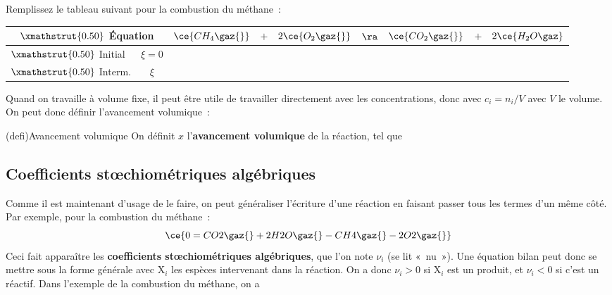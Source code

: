 \documentclass[../../main/main.tex]{subfiles}
\begin{document}
Remplissez le tableau suivant pour la combustion du méthane~:
\begin{center}
	\def\rhgt{0.50}
	\centering
	\begin{tabularx}{\linewidth}{|l|c|YdYdYdY|}
		\hline
		\multicolumn{2}{|c|}{
			$\xmathstrut{\rhgt}$
		\textbf{Équation}}                 &
		$\ce{CH_4\gaz{}}$                  & $+$       &
		$2\ce{O_2\gaz{}}$                  & $\ra$     &
		$\ce{CO_2\gaz{}}$                  & $+$       &
		$2\ce{H_2O\gaz}$                                 \\
		\hline
		$\xmathstrut{\rhgt}$
		Initial                            & $\xi = 0$ &
		       & \vline    &
		        & \vline    &
		       & \vline    &
		                       \\
		\hline
		$\xmathstrut{\rhgt}$
		Interm.                            & $\xi$     &
		 & \vline    &
		 & \vline    &
		 & \vline    &
		                \\
		\hline
	\end{tabularx}
\end{center}

Quand on travaille à volume fixe, il peut être utile de travailler directement
avec les concentrations, donc avec $c_i = n_i/V$ avec $V$ le volume. On peut
donc définir l'avancement volumique~:

\begin{tcb}[label=def:x, sidebyside, righthand ratio=.4](defi){Avancement volumique}
	On définit $x$ l'\textbf{avancement volumique} de la réaction, tel que
	\psw{
		\[
			\boxed{x = \frac{\xi}{V}}
		\]
	}
	\tcblower
\end{tcb}

\subsection{Coefficients stœchiométriques algébriques}

Comme il est maintenant d'usage de le faire, on peut généraliser l'écriture
d'une réaction en faisant passer tous les termes d'un même côté. Par exemple,
pour la combustion du méthane~:
\[
	\ce{0 = CO2\gaz{} + 2H2O\gaz{} - CH4\gaz{} - 2O2\gaz{}}
\]
Ceci fait apparaître les \textbf{coefficients stœchiométriques algébriques}, que
l'on note $\nu_i$ (se lit «~nu~»). Une équation bilan peut donc se mettre sous
la forme générale
\psw{
	\[
		\boxed{\sum_i \nu_i\mathrm{X}_i = 0}
	\]
}
avec $\mathrm{X}_i$ les espèces intervenant dans la réaction. On a donc $\nu_i
	>0$ si $\mathrm{X}_i$ est un produit, et $\nu_i < 0$ si c'est un réactif. Dans
l'exemple de la combustion du méthane, on a
\psw{
	\[
		\begin{array}{rcl}
			\nu_{\ce{CH4}} = -1 \qquad & \text{et} \qquad & \nu_{\ce{O2}}=-2 \\
			\nu_{\ce{CO2}} = 1 \qquad  & \text{et} \qquad & \nu_{\ce{H20}}=2
		\end{array}
	\]
}
\end{document}
